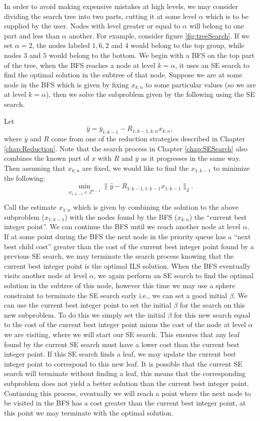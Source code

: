 \documentclass[12pt,Bold,letterpaper]{mcgilletdclass}
\begin{document}
In order to avoid making expensive mistakes at high levels, we may consider dividing the search tree into two parts, cutting it at some level $\alpha$ which is to be supplied by the user. Nodes with level greater or equal to $\alpha$ will belong to one part and less than $\alpha$ another. For example, consider figure \ref{fig:treeSearch}. If we set $\alpha = 2$, the nodes labeled $1,6,2$ and $4$ would belong to the top group, while nodes $3$ and $5$ would belong to the bottom. We begin with a BFS on the top part of the tree, when the BFS reaches a node at level $k=\alpha$, it uses an SE search to find the optimal solution in the subtree of that node. Suppose we are at some node in the BFS which is given by fixing $x_{k:n}$ to some particular values (so we are at level $k=\alpha$), then we solve the subproblem  given by the following using the SE search.

Let $$\hat{y} = \bar{y}_{1:k-1} - R_{1:k-1,k:n}x_{k:n},$$ where $\bar{y}$ and $R$ come from one of the reduction strategies described in Chapter \ref{chap:Reduction}. Note that the search process in Chapter \ref{chap:SESearch} also combines the known part of $x$ with $R$ and $\bar{y}$ as it progresses in the same way. Then assuming that $x_{k:n}$ are fixed, we would like to find the $x_{1:k-1}$ to minimize the following: $$\min_{x_{1:k-1} \in {\mathbb{Z}^{k-1} }}  \| \hat{y} - R_{1:k-1,1:k-1}x_{1:k-1} \|_2.$$

Call the estimate $x_{1:n}$ which is given by combining the solution to the above subproblem ($x_{1:k-1}$) with the nodes found by the BFS ($x_{k:n}$) the ``current best integer point''. We can continue the BFS until we reach another node at level $\alpha$. If at some point during the BFS the next node in the priority queue has a ``next best child cost'' greater than the cost of the current best integer point found by a previous SE search, we may terminate the search process knowing that the current best integer point is the optimal ILS solution. When the BFS eventually visits another node at level $\alpha$, we again perform an SE search to find the optimal solution in the subtree of this node, however this time we may use a sphere constraint to terminate the SE search early i.e., we can set a good initial $\beta$. We can use the current best integer point to set the initial $\beta$ for the search on this new subproblem. To do this we simply set the initial $\beta$ for this new search equal to the cost of the current best integer point minus the cost of the node at level $\alpha$ we are visiting, where we will start our SE search. This ensures that any leaf found by the current SE search must have a lower cost than the current best integer point. If this SE search finds a leaf, we may update the current best integer point to correspond to this new leaf. It is possible that the current SE search will terminate without finding a leaf, this means that the corresponding subproblem does not yield a better solution than the current best integer point. Continuing this process, eventually we will reach a point where the next node to be visited in the BFS has a cost greater than the current best integer point, at this point we may terminate with the optimal solution.
\end{document}
